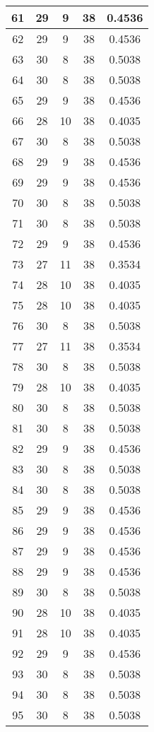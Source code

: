 \documentclass[letterpaper, 12pt]{article}
\begin{document}
\begin{longtable}{|c|c|c|c|c|}
\hline
61 & 29 & 9 & 38 & 0.4536 \\
\hline
62 & 29 & 9 & 38 & 0.4536 \\
\hline
63 & 30 & 8 & 38 & 0.5038 \\
\hline
64 & 30 & 8 & 38 & 0.5038 \\
\hline
65 & 29 & 9 & 38 & 0.4536 \\
\hline
66 & 28 & 10 & 38 & 0.4035 \\
\hline
67 & 30 & 8 & 38 & 0.5038 \\
\hline
68 & 29 & 9 & 38 & 0.4536 \\
\hline
69 & 29 & 9 & 38 & 0.4536 \\
\hline
70 & 30 & 8 & 38 & 0.5038 \\
\hline
71 & 30 & 8 & 38 & 0.5038 \\
\hline
72 & 29 & 9 & 38 & 0.4536 \\
\hline
73 & 27 & 11 & 38 & 0.3534 \\
\hline
74 & 28 & 10 & 38 & 0.4035 \\
\hline
75 & 28 & 10 & 38 & 0.4035 \\
\hline
76 & 30 & 8 & 38 & 0.5038 \\
\hline
77 & 27 & 11 & 38 & 0.3534 \\
\hline
78 & 30 & 8 & 38 & 0.5038 \\
\hline
79 & 28 & 10 & 38 & 0.4035 \\
\hline
80 & 30 & 8 & 38 & 0.5038 \\
\hline
81 & 30 & 8 & 38 & 0.5038 \\
\hline
82 & 29 & 9 & 38 & 0.4536 \\
\hline
83 & 30 & 8 & 38 & 0.5038 \\
\hline
84 & 30 & 8 & 38 & 0.5038 \\
\hline
85 & 29 & 9 & 38 & 0.4536 \\
\hline
86 & 29 & 9 & 38 & 0.4536 \\
\hline
87 & 29 & 9 & 38 & 0.4536 \\
\hline
88 & 29 & 9 & 38 & 0.4536 \\
\hline
89 & 30 & 8 & 38 & 0.5038 \\
\hline
90 & 28 & 10 & 38 & 0.4035 \\
\hline
91 & 28 & 10 & 38 & 0.4035 \\
\hline
92 & 29 & 9 & 38 & 0.4536 \\
\hline
93 & 30 & 8 & 38 & 0.5038 \\
\hline
94 & 30 & 8 & 38 & 0.5038 \\
\hline
95 & 30 & 8 & 38 & 0.5038 \\

\end{longtable}
\end{document}
